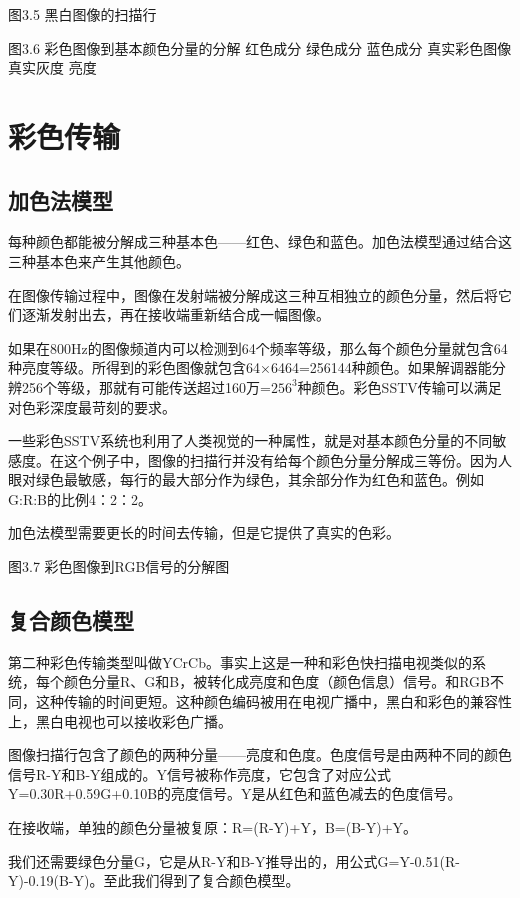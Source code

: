 图3.5 黑白图像的扫描行

图3.6 彩色图像到基本颜色分量的分解
红色成分
绿色成分
蓝色成分
真实彩色图像
真实灰度
亮度

\section{彩色传输}

\subsection{加色法模型}

每种颜色都能被分解成三种基本色——红色、绿色和蓝色。加色法模型通过结合这三种基本色来产生其他颜色。

在图像传输过程中，图像在发射端被分解成这三种互相独立的颜色分量，然后将它们逐渐发射出去，再在接收端重新结合成一幅图像。

如果在800Hz的图像频道内可以检测到64个频率等级，那么每个颜色分量就包含64种亮度等级。所得到的彩色图像就包含64×6464=256144种颜色。如果解调器能分辨256个等级，那就有可能传送超过160万=$256^{3}$种颜色。彩色SSTV传输可以满足对色彩深度最苛刻的要求。

一些彩色SSTV系统也利用了人类视觉的一种属性，就是对基本颜色分量的不同敏感度。在这个例子中，图像的扫描行并没有给每个颜色分量分解成三等份。因为人眼对绿色最敏感，每行的最大部分作为绿色，其余部分作为红色和蓝色。例如G:R:B的比例4：2：2。

加色法模型需要更长的时间去传输，但是它提供了真实的色彩。

图3.7 彩色图像到RGB信号的分解图

\subsection{复合颜色模型}

第二种彩色传输类型叫做YCrCb。事实上这是一种和彩色快扫描电视类似的系统，每个颜色分量R、G和B，被转化成亮度和色度（颜色信息）信号。和RGB不同，这种传输的时间更短。这种颜色编码被用在电视广播中，黑白和彩色的兼容性上，黑白电视也可以接收彩色广播。

图像扫描行包含了颜色的两种分量——亮度和色度。色度信号是由两种不同的颜色信号R-Y和B-Y组成的。Y信号被称作亮度，它包含了对应公式Y=0.30R+0.59G+0.10B的亮度信号。Y是从红色和蓝色减去的色度信号。

在接收端，单独的颜色分量被复原：R=(R-Y)+Y，B=(B-Y)+Y。

我们还需要绿色分量G，它是从R-Y和B-Y推导出的，用公式G=Y-0.51(R-Y)-0.19(B-Y)。至此我们得到了复合颜色模型。

